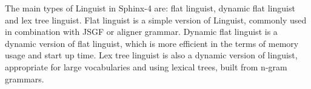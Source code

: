The main types of Linguist in Sphinx-4 are: flat linguist, dynamic flat linguist
and lex tree linguist. Flat linguist is a simple version of Linguist, commonly
used in combination with JSGF or aligner grammar.  Dynamic flat linguist is a
dynamic version of flat linguist, which is more efficient in the terms of memory usage and start up time.
Lex tree linguist is also a dynamic version of linguist, appropriate for large
vocabularies and using lexical trees, built from n-gram grammars. 











